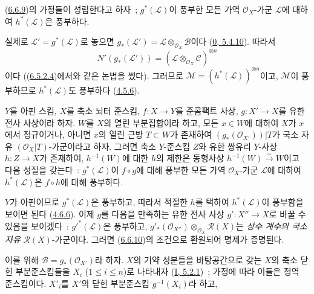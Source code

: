 \begin{corollary}[6.6.10]
\label{II.6.6.10-ko}
(\hyperref[II.6.6.9-ko]{6.6.9})의 가정들이 성립한다고 하자~;
$g^*(\mathcal{L})$이 풍부한 모든 가역 $\mathcal{O}_X$-가군
$\mathcal{L}$에 대하여 $h^*(\mathcal{L})$은 풍부하다.
\end{corollary}

실제로 $\mathcal{L}'=g^*(\mathcal{L})$로 놓으면
$g_*(\mathcal{L}')=\mathcal{L}\otimes_{\mathcal{O}_X}\mathcal{B}$이다
(\hyperref[0.5.4.10-ko]{0, 5.4.10}). 따라서
\[
N'(g_*(\mathcal{L}'))=
(\mathcal{L}\otimes_{\mathcal{O}_X}\mathcal{C})^{\otimes n}
\]
이다 ((\hyperref[II.6.5.2.4-ko]{6.5.2.4})에서와 같은 논법을 썼다).
그러므로 $\mathcal{M}=(h^*(\mathcal{L}))^{\otimes n}$이고,
$\mathcal{M}$이 풍부하므로 $h^*(\mathcal{L})$도 풍부하다
(\hyperref[II.4.5.6-ko]{4.5.6}).

\begin{proposition}[6.6.11]
\label{II.6.6.11-ko}
$Y$를 아핀 스킴, $X$를 축소 뇌터 준스킴,
$f:X\to Y$를 준콤팩트 사상, $g:X'\to X$를 유한 전사 사상이라 하자.
$W$를 $X$의 열린 부분집합이라 하고, 모든 $x\in W$에 대하여 $X$가
$x$에서 정규이거나, 아니면 $x$의 열린 근방 $T\subset W$가 존재하여
$(g_*(\mathcal{O}_{X'}))|T$가 국소 자유
$(\mathcal{O}_X|T)$-가군이라고 하자. 그러면 축소 $Y$-준스킴 $Z$와
유한 쌍유리 $Y$-사상 $h:Z\to X$가 존재하여, $h^{-1}(W)$에 대한
$h$의 제한은 동형사상 $h^{-1}(W)\xrightarrow{\sim}W$이고 다음 성질을
갖는다~: $g^*(\mathcal{L})$이 $f\circ g$에 대해 풍부한 모든 가역
$\mathcal{O}_X$-가군 $\mathcal{L}$에 대하여 $h^*(\mathcal{L})$은
$f\circ h$에 대해 풍부하다.
\end{proposition}

$Y$가 아핀이므로 $g^*(\mathcal{L})$은 풍부하고, 따라서 적절한 $h$를
택하여 $h^*(\mathcal{L})$이 풍부함을 보이면 된다
(\hyperref[II.4.6.6-ko]{4.6.6}). 이제 $g$를 다음을 만족하는 유한 전사
사상 $g':X''\to X$로 바꿀 수 있음을 보이겠다~: ${g'}^*(\mathcal{L})$은
풍부하고,
$g'_*(\mathcal{O}_{X''})\otimes_{\mathcal{O}_X}\mathcal{R}(X)$는
\emph{상수 계수의 국소 자유} $\mathcal{R}(X)$-가군이다. 그러면
(\hyperref[II.6.6.10-ko]{6.6.10})의 조건으로 환원되어 명제가 증명된다.

이를 위해 $\mathcal{B}=g_*(\mathcal{O}_{X'})$라 하자. $X$의 기약
성분들을 바탕공간으로 갖는 $X$의 축소 닫힌 부분준스킴들을
$X_i$ ($1\leq i\leq n$)로 나타내자
(\hyperref[I.5.2.1-ko]{I, 5.2.1})~; 가정에 따라 이들은 정역
준스킴이다. $X'_i$를 $X'$의 닫힌 부분준스킴 $g^{-1}(X_i)$라 하고,


